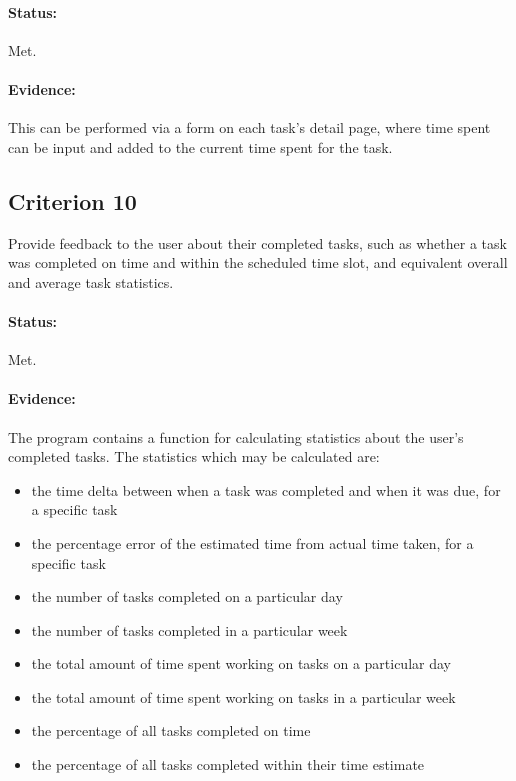 \documentclass{article}
\begin{document}
\paragraph{Status:}
Met.

\paragraph{Evidence:}
This can be performed via a form on each task's detail page,
where time spent can be input and added to the current time spent for the task.

\subsection*{Criterion 10}
Provide feedback to the user about their completed tasks,
such as whether a task was completed on time and within the scheduled time slot,
and equivalent overall and average task statistics.

\paragraph{Status:}
Met.

\paragraph{Evidence:}
The program contains a function for calculating statistics about the user's completed tasks.
The statistics which may be calculated are:
\begin{samepage}
	\begin{itemize}
		\item the time delta between when a task was completed and when it was due,
		      for a specific task
		\item the percentage error of the estimated time from actual time taken,
		      for a specific task
		\item the number of tasks completed on a particular day
		\item the number of tasks completed in a particular week
		\item the total amount of time spent working on tasks on a particular day
		\item the total amount of time spent working on tasks in a particular week
		\item the percentage of all tasks completed on time
		\item the percentage of all tasks completed within their time estimate
	\end{itemize}
\end{samepage}
\end{document}
